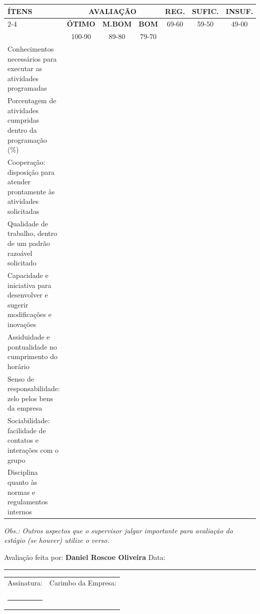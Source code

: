 \documentclass[12pt,a4paper]{article}
\begin{document}
\renewcommand{\arraystretch}{1.4}
\noindent\begin{tabularx}{\textwidth}{|X|c|c|c|c|c|c|}
\hline
\multirow{2}{*}{\textbf{ÍTENS}} & \multicolumn{3}{c|}{\textbf{AVALIAÇÃO}} & \textbf{REG.} & \textbf{SUFIC.} & \textbf{INSUF.} \\
\cline{2-4}
 & \textbf{ÓTIMO} & \textbf{M.BOM} & \textbf{BOM} & 69-60 & 59-50 & 49-00 \\
 & 100-90 & 89-80 & 79-70 &  &  &  \\
\hline
Conhecimentos necessários para executar as atividades programadas &  &  &  &  &  &  \\
\hline
Porcentagem de atividades cumpridas dentro da programação (\%) &  &  &  &  &  &  \\
\hline
Cooperação: disposição para atender prontamente às atividades solicitadas &  &  &  &  &  &  \\
\hline
Qualidade de trabalho, dentro de um padrão razoável solicitado &  &  &  &  &  &  \\
\hline
Capacidade e iniciativa para desenvolver e sugerir modificações e inovações &  &  &  &  &  &  \\
\hline
Assiduidade e pontualidade no cumprimento do horário &  &  &  &  &  &  \\
\hline
Senso de responsabilidade: zelo pelos bens da empresa &  &  &  &  &  &  \\
\hline
Sociabilidade: facilidade de contatos e interações com o grupo &  &  &  &  &  &  \\
\hline
Disciplina quanto às normas e regulamentos internos &  &  &  &  &  &  \\
\hline
\end{tabularx}

\vspace{0.4cm}

\noindent\textit{Obs.: Outros aspectos que o supervisor julgar importante para avaliação do estágio (se houver) utilize o verso.}

\vspace{1cm}

\noindent Avaliação feita por: \textbf{Daniel Roscoe Oliveira} \hfill Data: \rule{3cm}{0.4pt}

\vspace{1.5cm}

\noindent\begin{tabular}{p{8cm}p{6cm}}
Assinatura: & Carimbo da Empresa: \\
\\
\rule{7cm}{0.4pt} & \\
\end{tabular}
\end{document}
